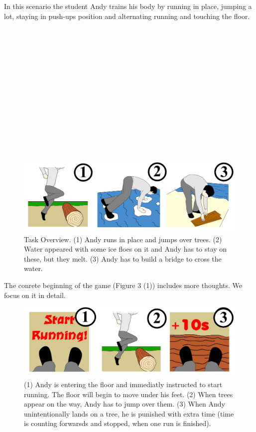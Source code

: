 \documentclass[twocolumn,showpacs,%
  nofootinbib,aps,superscriptaddress,%
  eqsecnum,prd,notitlepage,showkeys,10pt]{revtex4-1}
\begin{document}
In this scenario the student Andy trains his body by running in place, jumping a lot, staying in push-ups position and alternating running and touching the floor.

\textcolor{white}{
Text Text Text Text Text Text Text Text Text Text Text Text Text Text Text Text Text Text Text Text Text Text Text Text Text Text Text Text Text Text Text Text Text Text Text Text Text Text Text Text Text Text Text Text Text Text
Text Text Text Text Text Text Text Text Text Text Text Text Text Text Text Text Text Text Text Text Text Text Text Text Text Text Text Text Text Text Text Text Text Text Text Text Text Text Text Text Text Text Text Text Text Text
Text Text Text Text Text Text Text Text Text Text Text Text Text Text Text Text Text Text Text Text Text Text Text Text Text Text Text Text Text Text Text Text Text Text Text Text Text Text Text Text Text Text Text Text Text Text
Text Text Text Text Text Text Text Text Text Text Text Text Text Text Text Text Text Text Text Text Text Text Text Text Text Text Text Text Text Text Text Text Text Text Text Text Text Text Text Text Text Text Text Text Text Text
}

\begin{figure}[!htb]
  \includegraphics[width=\linewidth]{graphics/Image(11).jpg}
\endminipage\hfill
  \caption{Task Overview. (1) Andy runs in place and jumps over trees. (2) Water appeared  with some ice floes on it and Andy has to stay on these, but they melt. (3) Andy has to build a bridge to cross the water.}\label{fig:awesome_image3}
\end{figure}

The conrete beginning of the game (Figure 3 (1)) includes more thoughts. We focus on it in detail.

\begin{figure}[!htb]
  \includegraphics[width=\linewidth]{graphics/Image(12).jpg}
\endminipage\hfill
  \caption{(1) Andy is entering the floor and immediatly instructed to start running. The floor will begin to move under his feet. (2) When trees appear on the way, Andy has to jump over them. (3) When Andy unintentionally lands on a tree, he is punished with extra time (time is counting forwarsds and stopped, when one run is finished).}\label{fig:awesome_image3}
\end{figure}
\end{document}
